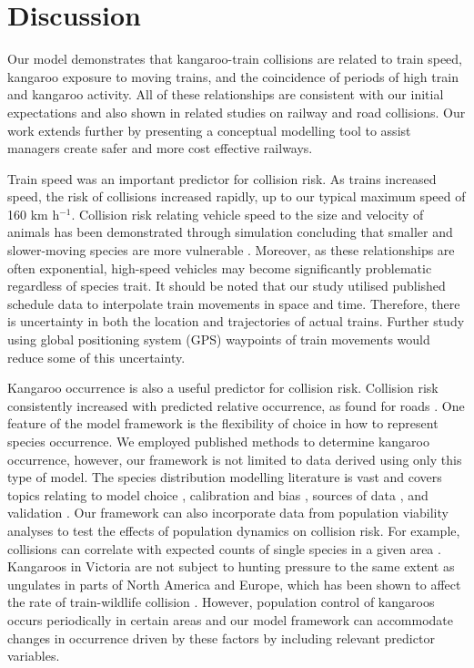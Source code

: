 \section{Discussion}

Our model demonstrates that kangaroo-train collisions are related to train speed, kangaroo exposure to moving trains, and the coincidence of periods of high train and kangaroo activity.  All of these relationships are consistent with our initial expectations and also shown in related studies on railway \citep{gund98} and road \citep{lao11,roge12} collisions. Our work extends further by presenting a conceptual modelling tool to assist managers create safer and more cost effective railways.

Train speed was an important predictor for collision risk.  As trains increased speed, the risk of collisions increased rapidly, up to our typical maximum speed of 160 km h$^{-1}$.  Collision risk relating vehicle speed to the size and velocity of animals has been demonstrated through simulation \citep{jaar06} concluding that smaller and slower-moving species are more vulnerable \citep[also see][]{fahr09}. Moreover, as these relationships are often exponential, high-speed vehicles may become significantly problematic regardless of species trait. It should be noted that our study utilised published schedule data to interpolate train movements in space and time. Therefore, there is uncertainty in both the location and trajectories of actual trains. Further study using global positioning system (GPS) waypoints of train movements would reduce some of this uncertainty.

Kangaroo occurrence is also a useful predictor for collision risk. Collision risk consistently increased with predicted relative occurrence, as found for roads \citep{lao11,roge09}.  One feature of the model framework is the flexibility of choice in how to represent species occurrence.  We employed published methods to determine kangaroo occurrence, however, our framework is not limited to data derived using only this type of model.  The species distribution modelling literature is vast and covers topics relating to model choice \citep{guil15}, calibration and bias \citep{phil10}, sources of data \citep{vans13}, and validation \citep{chiv14}.  Our framework can also incorporate data from population viability analyses to test the effects of population dynamics on collision risk. For example, collisions can correlate with expected counts of single species in a given area \citep{skor13}.  Kangaroos in Victoria are not subject to hunting pressure to the same extent as ungulates in parts of North America and Europe, which has been shown to affect the rate of train-wildlife collision \citep{seil05}.  However, population control of kangaroos occurs periodically in certain areas and our model framework can accommodate changes in occurrence driven by these factors by including relevant predictor variables. 

